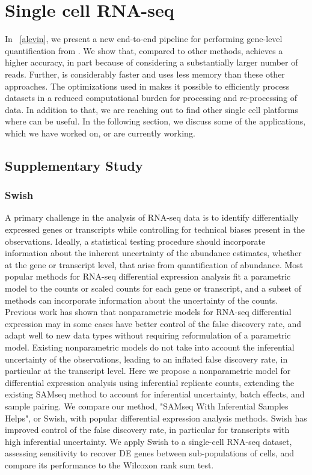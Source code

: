 \section{Single cell RNA-seq}
In ~\cref{alevin}, we present a new end-to-end pipeline for performing gene-level 
quantification from \dscrnaseq. We show that, compared to other methods, \alevin achieves
a higher accuracy, in part because of considering a substantially larger number
of reads. Further, \alevin is considerably faster and uses less memory than
these other approaches. The optimizations used in \alevin makes it possible to 
efficiently process \dscrnaseq datasets in a reduced computational burden for 
processing and re-processing of \dscrnaseq data. In addition to that, we are reaching out to 
find other single cell platforms where \alevin can be useful. 
In the following section, we discuss some of the applications, which we have worked on, 
or are currently working.

\subsection{Supplementary Study}
\subsubsection{Swish ~\citep{zhu2019nonparametric}}
A primary challenge in the analysis of RNA-seq data is to identify differentially 
expressed genes or transcripts while controlling for technical biases present in 
the observations. Ideally, a statistical testing procedure should incorporate 
information about the inherent uncertainty of the abundance estimates, whether at 
the gene or transcript level, that arise from quantification of abundance. Most 
popular methods for RNA-seq differential expression analysis fit a parametric model 
to the counts or scaled counts for each gene or transcript, and a subset of methods 
can incorporate information about the uncertainty of the counts. Previous work has 
shown that nonparametric models for RNA-seq differential expression may in some cases 
have better control of the false discovery rate, and adapt well to new data types 
without requiring reformulation of a parametric model. Existing nonparametric models 
do not take into account the inferential uncertainty of the observations, leading to 
an inflated false discovery rate, in particular at the transcript level. Here we 
propose a nonparametric model for differential expression analysis using inferential 
replicate counts, extending the existing SAMseq method to account for inferential 
uncertainty, batch effects, and sample pairing. We compare our method, 
"SAMseq With Inferential Samples Helps", or Swish, with popular differential 
expression analysis methods. Swish has improved control of the false discovery rate, 
in particular for transcripts with high inferential uncertainty. We apply Swish to 
a single-cell RNA-seq dataset, assessing sensitivity to recover DE genes between 
sub-populations of cells, and compare its performance to the Wilcoxon rank sum test.


